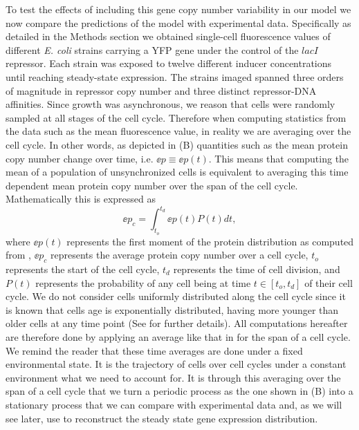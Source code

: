 To test the effects of including this gene copy number variability in our model
we now compare the predictions of the model with experimental data.
Specifically as detailed in the Methods section we obtained single-cell
fluorescence values of different {\it E. coli} strains carrying a YFP gene 
under the control of the $lacI$ repressor. Each strain was exposed to twelve
different inducer concentrations until reaching steady-state expression. The
strains imaged spanned three orders of magnitude in repressor copy number and
three distinct repressor-DNA affinities. Since growth was asynchronous, we
reason that cells were randomly sampled at all stages of the cell cycle.
Therefore when computing statistics from the data such as the mean fluorescence
value, in reality we are averaging over the cell cycle. In other words, as
depicted in (B) quantities such as the mean protein copy
number change over time, i.e. $\ee{p} \equiv \ee{p(t)}$. This means that
computing the mean of a population of unsynchronized cells is equivalent to
averaging this time dependent mean protein copy number over the span of the
cell cycle. Mathematically this is expressed as
\begin{equation}
	\ee{p}_c = \int_{t_o}^{t_d} \ee{p(t)} P(t) dt,
	\label{eq_time_avg}
\end{equation}
where $\ee{p(t)}$ represents the first moment of the protein distribution as
computed from , $\ee{p}_c$ represents the average protein
copy number over a cell cycle, $t_o$ represents the start of the cell cycle,
$t_d$ represents the time of cell division, and $P(t)$ represents the
probability of any cell being at time $t \in [t_o, t_d]$ of their cell cycle.
We do not consider cells uniformly distributed along the cell cycle since it is
known that cells age is exponentially distributed, having more younger than
older cells at any time point \cite{Powell1956} (See 
for further details). All computations hereafter are therefore done by applying
an average like that in  for the span of a cell cycle. We
remind the reader that these time averages are done under a fixed environmental
state. It is the trajectory of cells over cell cycles under a constant
environment what we need to account for. It is through this averaging over the
span of a cell cycle that we turn a periodic process as the one shown in
(B) into a stationary process that we can compare with
experimental data and, as we will see later, use to reconstruct the steady
state gene expression distribution.

